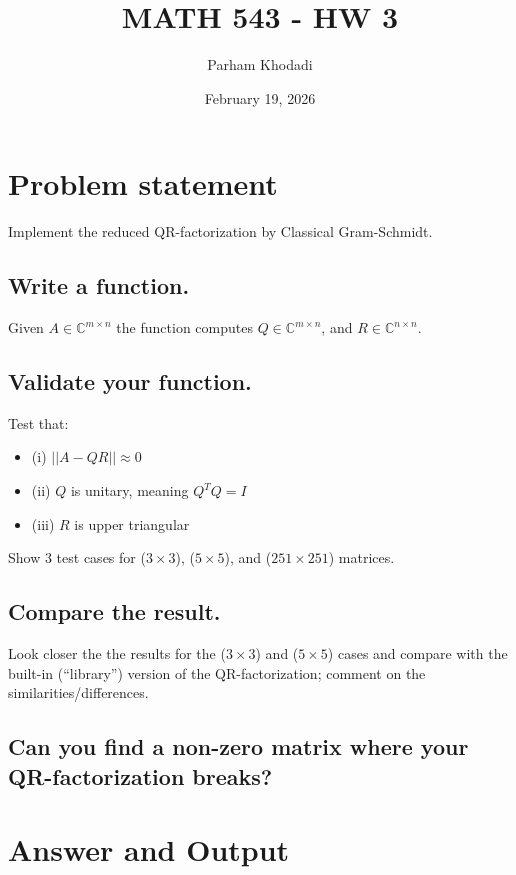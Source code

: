 \documentclass{article}
\title{MATH 543 - HW 3}
\author{Parham Khodadi}
\date{February 19, 2026}
\begin{document}
\maketitle

\section{Problem statement}
Implement the reduced QR-factorization by Classical Gram-Schmidt.

\subsection{Write a function.}
Given $A \in \mathbb{C}^{m \times n}$ the function computes $Q \in \mathbb{C}^{m \times n}$, and $R \in \mathbb{C}^{n \times n}$.
\subsection{Validate your function.}
Test that:
\begin{itemize}
    \item (i) $||A-QR|| \approx 0$
    \item (ii) $Q$ is unitary, meaning $Q^T Q = I$
    \item (iii) $R$ is upper triangular
\end{itemize}
Show 3 test cases for ($3\times3$), ($5 \times5$), and ($251\times251$) matrices.

\subsection{Compare the result.}
Look closer the the results for the ($3\times3$) and ($5 \times5$) cases and compare with the built-in (“library”) version of the QR-factorization; comment on the similarities/differences.

\subsection{Can you find a non-zero matrix where your QR-factorization breaks?}

\section{Answer and Output}
\end{document}

